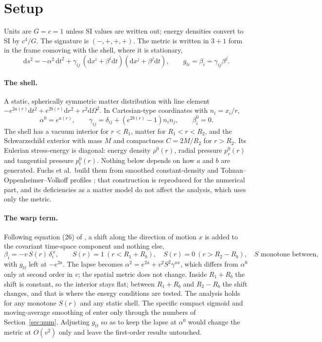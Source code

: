 \documentclass[11pt,a4paper]{article}
\theoremstyle{remark}
\newcommand{\dd}{\mathrm{d}}
\begin{document}
\section{Setup}\label{sec:setup}

Units are $G = c = 1$ unless SI values are written out; energy densities convert to SI by $c^4/G$. The signature is $(-,+,+,+)$. The metric is written in $3+1$ form in the frame comoving with the shell, where it is stationary,
\begin{equation}
\dd s^2 = -\alpha^2\,\dd t^2 + \gamma_{ij}\,(\dd x^i + \beta^i\dd t)(\dd x^j + \beta^j\dd t), \qquad g_{ti} = \beta_i = \gamma_{ij}\beta^j .
\label{eq:adm}
\end{equation}

\paragraph{The shell.} A static, spherically symmetric matter distribution with line element $-e^{2a(r)}\dd t^2 + e^{2b(r)}\dd r^2 + r^2\dd\Omega^2$. In Cartesian-type coordinates with $n_i = x_i/r$,
\begin{equation}
\alpha^0 = e^{a(r)}, \qquad \gamma_{ij} = \delta_{ij} + \left(e^{2b(r)}-1\right)n_i n_j, \qquad \beta^0_i = 0 .
\end{equation}
The shell has a vacuum interior for $r < R_1$, matter for $R_1 < r < R_2$, and the Schwarzschild exterior with mass $M$ and compactness $C = 2M/R_2$ for $r > R_2$. Its Eulerian stress-energy is diagonal: energy density $\rho^0(r)$, radial pressure $p_r^0(r)$ and tangential pressure $p_t^0(r)$. Nothing below depends on how $a$ and $b$ are generated. Fuchs et al.\ build them from smoothed constant-density and Tolman--Oppenheimer--Volkoff profiles \cite{Fuchs2024}; that construction is reproduced for the numerical part, and its deficiencies as a matter model \cite{Barzegar2026} do not affect the analysis, which uses only the metric.

\paragraph{The warp term.} Following equation (26) of \cite{Fuchs2024}, a shift along the direction of motion $x$ is added to the covariant time-space component and nothing else,
\begin{equation}
\beta_i = -v\,S(r)\,\delta_i^{\,x}, \qquad S(r) = 1 \ (r < R_1 + R_b), \quad S(r) = 0 \ (r > R_2 - R_b), \quad S \text{ monotone between,}
\label{eq:shift}
\end{equation}
with $g_{tt}$ left at $-e^{2a}$. The lapse becomes $\alpha^2 = e^{2a} + v^2 S^2\gamma^{xx}$, which differs from $\alpha^0$ only at second order in $v$; the spatial metric does not change. Inside $R_1 + R_b$ the shift is constant, so the interior stays flat; between $R_1 + R_b$ and $R_2 - R_b$ the shift changes, and that is where the energy conditions are tested. The analysis holds for any monotone $S(r)$ and any static shell. The specific compact sigmoid and moving-average smoothing of \cite{Fuchs2024} enter only through the numbers of Section~\ref{sec:num}. Adjusting $g_{tt}$ so as to keep the lapse at $\alpha^0$ would change the metric at $O(v^2)$ only and leave the first-order results untouched.
\end{document}
